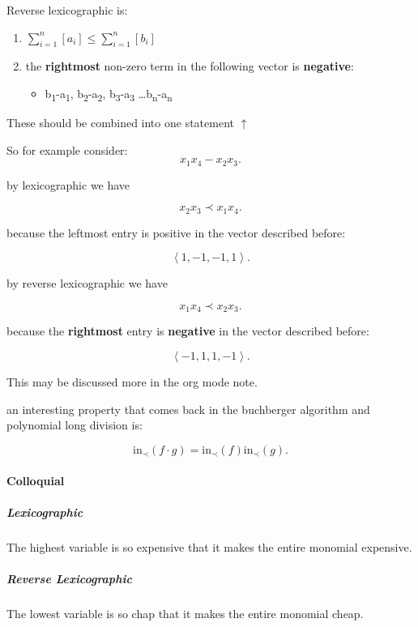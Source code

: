 \documentclass[a4paper,11pt,twoside]{article}
\begin{document}
Reverse lexicographic is:

\begin{enumerate}
\item \(\sum^{n}_{i=1}\left[ a_i  \right] \leq \sum^{n}_{i=1}\left[ b_i  \right]\)

\item the \textbf{rightmost} non-zero term in the following vector is \textbf{negative}:

\begin{itemize}
\item b\textsubscript{1}-a\textsubscript{1}, b\textsubscript{2}-a\textsubscript{2}, b\textsubscript{3}-a\textsubscript{3} \ldots{}b\textsubscript{n}-a\textsubscript{n}
\end{itemize}
\end{enumerate}

These should be combined into one statement \(\uparrow\)

So for example consider: $$x_1x_4-x_2x_3
 .$$

by lexicographic we have

$$x_2x_3\prec x_1x_4
 .$$

because the leftmost entry is positive in the vector described before:

$$\left\langle 1, -1, -1, 1\right \rangle
 .$$

by reverse lexicographic we have

$$x_1x_4 \prec x_2x_3
 .$$

because the \textbf{rightmost} entry is \textbf{negative} in the vector described
before:

$$\left\langle -1, 1, 1, -1\right \rangle
 .$$

This may be discussed more in the org mode note.

an interesting property that comes back in the buchberger algorithm and
polynomial long division is:

$$\mathrm{in}_{\prec}\left( f \cdot g \right) = \mathrm{in}_{\prec}\left( f \right) \mathrm{in}_{\prec}\left( g \right) 
 .$$

\paragraph{Colloquial}
\label{sec:org1dccab9}
\subparagraph{Lexicographic}
\label{sec:org975a56b}
The highest variable is so expensive that it makes the entire
monomial expensive.
\subparagraph{Reverse Lexicographic}
\label{sec:org91c7541}
The lowest variable is so chap that it makes the entire monomial cheap.
\end{document}
